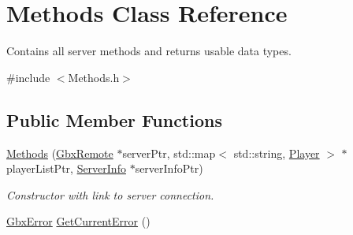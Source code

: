 \hypertarget{classMethods}{\section{Methods Class Reference}
\label{classMethods}
}


Contains all server methods and returns usable data types.  




{\ttfamily \#include $<$Methods.\-h$>$}

\subsection*{Public Member Functions}
\begin{DoxyCompactItemize}
\item 
\hyperlink{classMethods_ae35c8183fa69c2e3cf449603011b901e}{Methods} (\hyperlink{classGbxRemote}{Gbx\-Remote} $\ast$server\-Ptr, std\-::map$<$ std\-::string, \hyperlink{structPlayer}{Player} $>$ $\ast$player\-List\-Ptr, \hyperlink{structServerInfo}{Server\-Info} $\ast$server\-Info\-Ptr)
\begin{DoxyCompactList}\small\item\em Constructor with link to server connection. \end{DoxyCompactList}\item 
\hypertarget{classMethods_ada628a190370ff0914a55bfd8e0acd4f}{\hyperlink{structGbxError}{Gbx\-Error} \hyperlink{classMethods_ada628a190370ff0914a55bfd8e0acd4f}{Get\-Current\-Error} ()}\label{classMethods_ada628a190370ff0914a55bfd8e0acd4f}


\end{DoxyCompactItemize}
